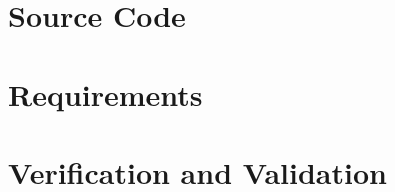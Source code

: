 \documentclass{simcenterdocumentation}
\begin{document}
\chapter{Source Code}



\chapter{Requirements}


\chapter{Verification and Validation}



\pagestyle{plain}
{
  \renewcommand{\thispagestyle}[1]{}
  \printbibliography           
}
\end{document}

